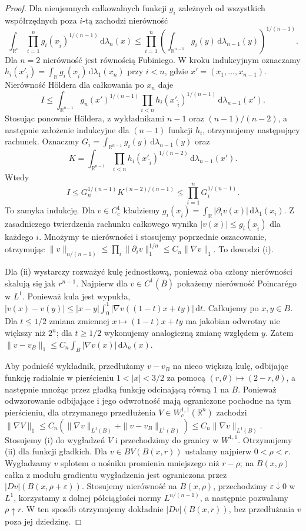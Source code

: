 \documentclass[11pt,a4paper,oneside]{book}
\numberwithin{equation}{chapter}
\theoremstyle{plain}
\theoremstyle{definition}
\theoremstyle{remark}
\begin{document}
\begin{proof}
Dla nieujemnych całkowalnych funkcji $g_i$ zależnych od
wszystkich współrzędnych poza $i$-tą zachodzi nierówność
\[
 \int_{\mathbb R^n}\prod_{i=1}^n
 g_i(x_{\widehat i})^{1/(n-1)}\,\mathrm d\lambda_n(x)
 \le\prod_{i=1}^n
 \left(\int_{\mathbb R^{n-1}}g_i(y)\,
 \mathrm d\lambda_{n-1}(y)\right)^{1/(n-1)}.
\]
Dla $n=2$ nierówność jest równością Fubiniego.
W kroku indukcyjnym oznaczamy
$h_i(x'_{\widehat i})=\int_{\mathbb R}
 g_i(x_{\widehat i})\,\mathrm d\lambda_1(x_n)$
przy $i<n$, gdzie $x'=(x_1,\ldots,x_{n-1})$.
Nierówność Höldera dla całkowania po $x_n$ daje
\[
 I\le\int_{\mathbb R^{n-1}}g_n(x')^{1/(n-1)}
 \prod_{i<n}h_i(x'_{\widehat i})^{1/(n-1)}
 \,\mathrm d\lambda_{n-1}(x').
\]
Stosując ponownie Höldera, z wykładnikami
$n-1$ oraz $(n-1)/(n-2)$, a następnie
założenie indukcyjne dla $(n-1)$ funkcji $h_i$,
otrzymujemy następujący rachunek. Oznaczmy
$G_i=\int_{\mathbb R^{n-1}}g_i(y)\,
\mathrm d\lambda_{n-1}(y)$ oraz
\[
 K=\int_{\mathbb R^{n-1}}\prod_{i<n}
 h_i(x'_{\widehat i})^{1/(n-2)}
 \,\mathrm d\lambda_{n-1}(x').
\]
Wtedy
\[
 I\le G_n^{1/(n-1)}K^{(n-2)/(n-1)}
 \le\prod_{i=1}^n G_i^{1/(n-1)}.
\]
To zamyka indukcję.
Dla $v\in C_c^1$ kładziemy
$g_i(x_{\widehat i})=\int_{\mathbb R}
|\partial_i v(x)|\,\mathrm d\lambda_1(x_i)$.
Z zasadniczego twierdzenia rachunku całkowego wynika
$|v(x)|\le g_i(x_{\widehat i})$ dla każdego $i$.
Mnożymy te nierówności i stosujemy poprzednie
oszacowanie, otrzymując
$\|v\|_{n/(n-1)}\le\prod_i\|\partial_i v\|_1^{1/n}
\le C_n\|\nabla v\|_1$. To dowodzi (i).

Dla (ii) wystarczy rozważyć kulę jednostkową,
ponieważ oba człony nierówności skalują się jak
$r^{n-1}$. Najpierw dla $v\in C^1(\overline B)$
pokażemy nierówność Poincarégo w $L^1$.
Ponieważ kula jest wypukła,
$|v(x)-v(y)|\le|x-y|\int_0^1
|\nabla v((1-t)x+ty)|\,\mathrm dt$.
Całkujemy po $x,y\in B$. Dla $t\le1/2$ zmiana
zmiennej $x\mapsto(1-t)x+ty$ ma jakobian odwrotny
nie większy niż $2^n$; dla $t\ge1/2$ wykonujemy
analogiczną zmianę względem $y$. Zatem
$\|v-v_B\|_1\le C_n\int_B|\nabla v(x)|\,\mathrm d\lambda_n(x)$.

Aby podnieść wykładnik, przedłużamy $v-v_B$
na nieco większą kulę, odbijając funkcję radialnie
w pierścieniu $1<|x|<3/2$ za pomocą
$(r,\theta)\mapsto(2-r,\theta)$, a następnie
mnożąc przez gładką funkcję odcinającą równą $1$
na $B$. Ponieważ odwzorowanie odbijające i jego
odwrotność mają ograniczone pochodne na tym pierścieniu,
dla otrzymanego przedłużenia $V\in W^{1,1}_c(\mathbb R^n)$
zachodzi
$\|\nabla V\|_1\le C_n(\|\nabla v\|_{L^1(B)}+
\|v-v_B\|_{L^1(B)})\le C_n\|\nabla v\|_{L^1(B)}$.
Stosujemy (i) do wygładzeń $V$ i przechodzimy do
granicy w $W^{1,1}$. Otrzymujemy (ii) dla funkcji
gładkich. Dla $v\in BV(B(x,r))$ ustalamy najpierw
$0<\rho<r$. Wygładzamy $v$ splotem o nośniku
promienia mniejszego niż $r-\rho$; na $B(x,\rho)$
całka z modułu gradientu wygładzenia jest
ograniczona przez $|Dv|(B(x,\rho+\varepsilon))$.
Stosujemy nierówność na $B(x,\rho)$, przechodzimy
$\varepsilon\downarrow0$ w $L^1$, korzystamy z
dolnej półciągłości normy $L^{n/(n-1)}$, a
następnie pozwalamy $\rho\uparrow r$. W ten
sposób otrzymujemy dokładnie $|Dv|(B(x,r))$,
bez przedłużania $v$ poza jej dziedzinę.


\end{proof}
\end{document}
